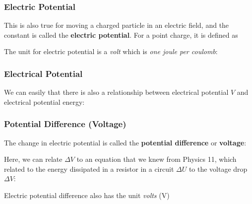 \documentclass[12pt,aspectratio=169]{beamer}
\newcommand{\mb}[1]{\mathbf{#1}}
\begin{document}
\begin{frame}
  \frametitle{Electric Potential}

  This is also true for moving a charged particle in an electric field, and the
  constant is called the \textbf{electric potential}. For a point charge, it is
  defined as


  The unit for electric potential is a \emph{volt} which is
  \emph{one joule per coulomb}:

\end{frame}


\begin{frame}
  \frametitle{Electrical Potential}
  
  We can easily that there is also a relationship between electrical potential
  $V$ and electrical potential energy:
  
  \vspace{-.2in}{\Large
    \begin{displaymath}
      \boxed{\Delta V=-\int\mb{E}\cdot d\mb{s}}
    \end{displaymath}
  }
\end{frame}



\begin{frame}
  \frametitle{Potential Difference (Voltage)}

  The change in electric potential is called the
  \textbf{potential difference} or \textbf{voltage}:


  Here, we can relate $\Delta V$ to an equation that we knew from Physics 11,
  which related to the energy dissipated in a resistor in a circuit
  $\Delta U$ to the voltage drop $\Delta V$:
    
  \vspace{-.2in}{\Large\[\boxed{\Delta U=q\Delta V}\]}

  Electric potential difference also has the unit \emph{volts} (\si{V})
\end{frame}
\end{document}
